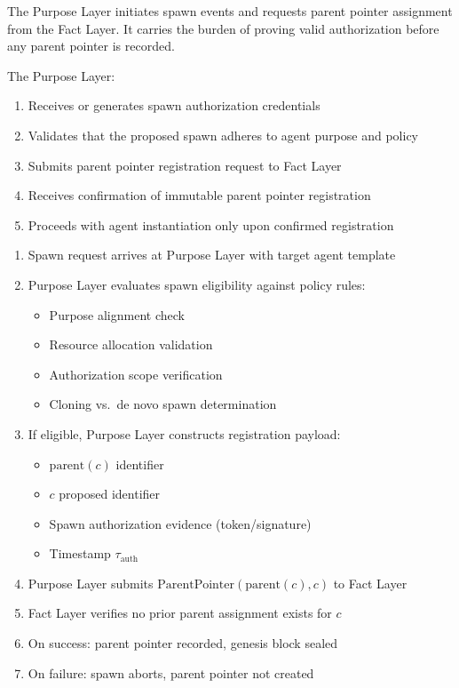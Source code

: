 The Purpose Layer initiates spawn events and requests parent pointer assignment from the Fact Layer. It carries the burden of proving valid authorization before any parent pointer is recorded.

\begin{definition}
The Purpose Layer:
\begin{enumerate}
    \item Receives or generates spawn authorization credentials
    \item Validates that the proposed spawn adheres to agent purpose and policy
    \item Submits parent pointer registration request to Fact Layer
    \item Receives confirmation of immutable parent pointer registration
    \item Proceeds with agent instantiation only upon confirmed registration
\end{enumerate}
\end{definition}

\begin{protocol}
\begin{enumerate}
    \item Spawn request arrives at Purpose Layer with target agent template
    \item Purpose Layer evaluates spawn eligibility against policy rules:
    \begin{itemize}
        \item Purpose alignment check
        \item Resource allocation validation
        \item Authorization scope verification
        \item Cloning vs.\ de novo spawn determination
    \end{itemize}
    \item If eligible, Purpose Layer constructs registration payload:
    \begin{itemize}
        \item $\text{parent}(c)$ identifier
        \item $c$ proposed identifier
        \item Spawn authorization evidence (token/signature)
        \item Timestamp $\tau_\text{auth}$
    \end{itemize}
    \item Purpose Layer submits $\text{ParentPointer}(\text{parent}(c), c)$ to Fact Layer
    \item Fact Layer verifies no prior parent assignment exists for $c$
    \item On success: parent pointer recorded, genesis block sealed
    \item On failure: spawn aborts, parent pointer not created
\end{enumerate}
\end{protocol}


